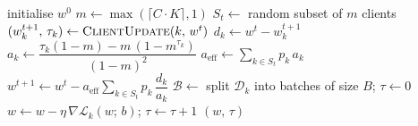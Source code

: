 \documentclass[11pt,a4paper]{article}
\begin{document}
\begin{algorithm}[H]
\caption{\textsc{FedNova} \citep{wang2020fednova}. Local optimisation is
identical to \textsc{FedAvg}; only the server-side aggregation differs.
Each client's update is rescaled by its momentum-aware normaliser $a_k$
so clients running different numbers of local steps $\tau_k$ contribute
updates of comparable magnitude.}
\label{alg:fednova}
\begin{algorithmic}[1]
  \State initialise $w^0$
    \State $m \gets \max(\lceil C \cdot K\rceil, 1)$
    \State $S_t \gets$ random subset of $m$ clients
      \State $(w_k^{t+1},\, \tau_k) \gets \textsc{ClientUpdate}(k,\, w^t)$
      \State $d_k \gets w^t - w_k^{t+1}$
      \State $a_k \gets
        \dfrac{\tau_k(1-m) - m\,(1-m^{\tau_k})}{(1-m)^2}$
    \EndFor
    \State $a_{\mathrm{eff}} \gets \sum_{k \in S_t} p_k\, a_k$
    \State $w^{t+1} \gets w^t - a_{\mathrm{eff}}
      \sum_{k \in S_t} p_k\, \dfrac{d_k}{a_k}$
  \EndFor
\EndProcedure
\Statex
{}
  \State $\mathcal{B} \gets$ split $\mathcal{D}_k$ into batches of size $B$;
    $\tau \gets 0$
      \State $w \gets w - \eta\, \nabla \mathcal{L}_k(w;\, b)$;
        $\tau \gets \tau + 1$
    \EndFor
  \EndFor
  \State \Return $(w,\, \tau)$
\EndProcedure
\end{algorithmic}
\end{algorithm}
\end{document}
